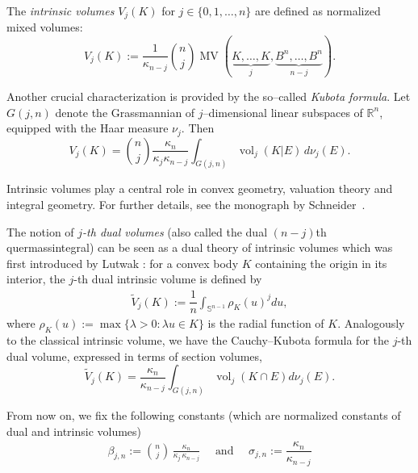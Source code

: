\documentclass[11pt]{article}
\theoremstyle{definition}
\numberwithin{equation}{section}
\newcommand{\R}{\mathbb{R}}
\newcommand{\Gr}[2]{G(#1,#2)}        %
\DeclareMathOperator{\vol}{vol}
\DeclareMathOperator{\MV}{MV}
\begin{document}
\medskip



The \emph{intrinsic volumes} $V_j(K)$ for $j \in \{ 0,1,\dots,n \}$ are defined as normalized mixed volumes:
\[
V_j(K) := \frac{1}{\kappa_{n-j}} {n \choose j}
\MV(\underbrace{K,\dots,K}_{j}, \underbrace{B^n,\dots,B^n}_{n-j}).
\]

\medskip

Another crucial characterization is provided by the so--called \emph{Kubota formula}.  
Let $G(j,n)$ denote the Grassmannian of $j$--dimensional linear subspaces of $\R^n$, equipped with the Haar measure $\nu_j$.  
Then
\begin{equation}\label{kubota}
V_j(K) = \binom{n}{j} \frac{\kappa_n}{\kappa_j \kappa_{n-j}}
\int_{\Gr{j}{n}} \vol_j(K | E) \, d\nu_j(E).
\end{equation}

Intrinsic volumes play a central role in convex geometry, valuation theory and integral geometry.
For further details, see the monograph by Schneider~\cite{Schneider}.

\medskip

The notion of \textit{$j$-th dual volumes} (also called the dual $(n - j)$th quermassintegral) can be seen as a dual theory of intrinsic volumes which was first introduced by Lutwak \cite{Lutwak_1975, Lutwak_1979, Lutwak_1988}: for a convex body $K$ containing the origin in its interior, the $j$-th dual intrinsic volume is defined by
\begin{align*}
    \widetilde V_j(K) := \dfrac{1}{n} \int_{\mathbb{S}^{n - 1}} \rho_K(u)^j du,
\end{align*}
where $\rho_K(u) := \max \{ \lambda > 0: \lambda u \in K \}$ is the radial function of $K$.
Analogously to the classical intrinsic volume, we have the Cauchy--Kubota formula for the $j$-th dual volume, expressed in terms of section volumes,
\begin{equation}\label{kubota-dual}
    \widetilde V_j(K) = \dfrac{\kappa_n}{\kappa_{n - j}} \int_{G(j, n)} \vol_j(K \cap E) d\nu_j(E).
\end{equation}

\medskip

From now on, we fix the following constants (which are normalized constants of dual and intrinsic volumes)
 \begin{align*}
        \beta_{j,n} := \binom{n}{j} \,\frac{\kappa_n}{\kappa_j\,\kappa_{n-j}} \quad \text{ and } \quad \sigma_{j, n} := \dfrac{\kappa_n}{\kappa_{n - j}}
\end{align*}
\end{document}
